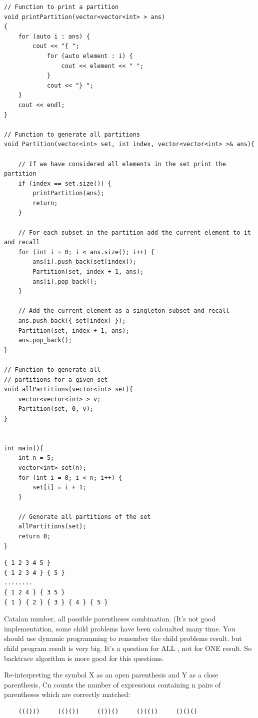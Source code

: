 \documentclass[a4paper,11pt,twoside]{book}
\begin{document}
\begin{lstlisting}
// Function to print a partition
void printPartition(vector<vector<int> > ans)
{
	for (auto i : ans) {
		cout << "{ ";
			for (auto element : i) {
				cout << element << " ";
			}
			cout << "} ";
	}
	cout << endl;
}

// Function to generate all partitions
void Partition(vector<int> set, int index, vector<vector<int> >& ans){
	
	// If we have considered all elements in the set print the partition
	if (index == set.size()) {
		printPartition(ans);
		return;
	}
	
	// For each subset in the partition add the current element to it and recall
	for (int i = 0; i < ans.size(); i++) {
		ans[i].push_back(set[index]);
		Partition(set, index + 1, ans);
		ans[i].pop_back();
	}
	
	// Add the current element as a singleton subset and recall
	ans.push_back({ set[index] });
	Partition(set, index + 1, ans);
	ans.pop_back();
}

// Function to generate all
// partitions for a given set
void allPartitions(vector<int> set){
	vector<vector<int> > v;
	Partition(set, 0, v);
}


int main(){
	int n = 5;
	vector<int> set(n);
	for (int i = 0; i < n; i++) {
		set[i] = i + 1;
	}
	
	// Generate all partitions of the set
	allPartitions(set);
	return 0;
}
\end{lstlisting}

\begin{lstlisting}
{ 1 2 3 4 5 } 
{ 1 2 3 4 } { 5 } 
........
{ 1 2 4 } { 3 5 } 
{ 1 } { 2 } { 3 } { 4 } { 5 } 
\end{lstlisting}
	
	\par Catalan number, all possible parentheses combination. (It's not good implementation, some child problems have been calcualted many time.  You should use dynamic programming to remember the child problems result. but child program result is very big.  It's a question for ALL , not for ONE result. So backtrace algorithm is more good for this questions. 
	
	\par Re-interpreting the symbol X as an open parenthesis and Y as a close parenthesis, Cn counts the number of expressions containing n pairs of parentheses which are correctly matched:
\begin{lstlisting}
	((()))     (()())     (())()     ()(())     ()()()
\end{lstlisting}	
	
\end{document}
